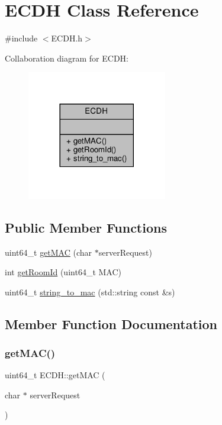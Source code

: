 \hypertarget{classECDH}{}\section{E\+C\+DH Class Reference}
\label{classECDH}


{\ttfamily \#include $<$E\+C\+D\+H.\+h$>$}



Collaboration diagram for E\+C\+DH\+:\nopagebreak
\begin{figure}[H]
\begin{center}
\leavevmode
\includegraphics[width=173pt]{classECDH__coll__graph}
\end{center}
\end{figure}
\subsection*{Public Member Functions}
\begin{DoxyCompactItemize}
\item 
uint64\+\_\+t \hyperlink{classECDH_a3ff5f397f1198e2f1daa7689434f338c}{get\+M\+AC} (char $\ast$server\+Request)
\item 
int \hyperlink{classECDH_ac552676079ed12da22501ead4d15500b}{get\+Room\+Id} (uint64\+\_\+t M\+AC)
\item 
uint64\+\_\+t \hyperlink{classECDH_a0b5fb1d5817ba51fe4e055190c3c88f2}{string\+\_\+to\+\_\+mac} (std\+::string const \&s)
\end{DoxyCompactItemize}


\subsection{Member Function Documentation}
\mbox{\label{classECDH_a3ff5f397f1198e2f1daa7689434f338c}} 
\subsubsection{\texorpdfstring{get\+M\+A\+C()}{getMAC()}}
{\footnotesize\ttfamily uint64\+\_\+t E\+C\+D\+H\+::get\+M\+AC (\begin{DoxyParamCaption}\item[{char $\ast$}]{server\+Request }\end{DoxyParamCaption})}

